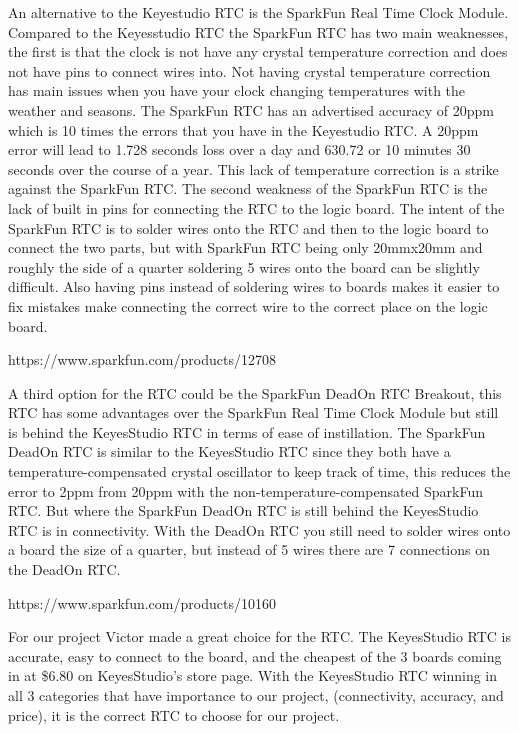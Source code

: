 \documentclass[10pt,draftclsnofoot,onecolumn]{IEEEtran}
\begin{document}
An alternative to the Keyestudio RTC is the SparkFun Real Time Clock Module. Compared to the Keyesstudio RTC the SparkFun RTC has two main weaknesses, the first is that the clock is not have any crystal temperature correction and does not have pins to connect wires into. Not having crystal temperature correction has main issues when you have your clock changing temperatures with the weather and seasons. The SparkFun RTC has an advertised accuracy of 20ppm which is 10 times the errors that you have in the Keyestudio RTC. A 20ppm error will lead to 1.728 seconds loss over a day and 630.72 or 10 minutes 30 seconds over the course of a year. This lack of temperature correction is a strike against the SparkFun RTC. The second weakness of the SparkFun RTC is the lack of built in pins for connecting the RTC to the logic board. The intent of the SparkFun RTC is to solder wires onto the RTC and then to the logic board to connect the two parts, but with SparkFun RTC being only 20mmx20mm and roughly the side of a quarter soldering 5 wires onto the board can be slightly difficult. Also having pins instead of soldering wires to boards makes it easier to fix mistakes make connecting the correct wire to the correct place on the logic board. 

https://www.sparkfun.com/products/12708

A third option for the RTC could be the SparkFun DeadOn RTC Breakout, this RTC has some advantages over the SparkFun Real Time Clock Module but still is behind the KeyesStudio RTC in terms of ease of instillation. The SparkFun DeadOn RTC is similar to the KeyesStudio RTC since they both have a temperature-compensated crystal oscillator to keep track of time, this reduces the error to 2ppm from 20ppm with the non-temperature-compensated SparkFun RTC. But where the SparkFun DeadOn RTC is still behind the KeyesStudio RTC is in connectivity. With the DeadOn RTC you still need to solder wires onto a board the size of a quarter, but instead of 5 wires there are 7 connections on the DeadOn RTC. 

https://www.sparkfun.com/products/10160

For our project Victor made a great choice for the RTC. The KeyesStudio RTC is accurate, easy to connect to the board, and the cheapest of the 3 boards coming in at \$6.80 on KeyesStudio’s store page. With the KeyesStudio RTC winning in all 3 categories that have importance to our project, (connectivity, accuracy, and price), it is the correct RTC to choose for our project. 
\end{document}
